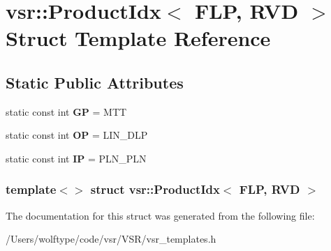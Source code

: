 \hypertarget{structvsr_1_1_product_idx_3_01_f_l_p_00_01_r_v_d_01_4}{\section{vsr\-:\-:Product\-Idx$<$ F\-L\-P, R\-V\-D $>$ Struct Template Reference}
\label{structvsr_1_1_product_idx_3_01_f_l_p_00_01_r_v_d_01_4}
}
\subsection*{Static Public Attributes}
\begin{DoxyCompactItemize}
\item 
\hypertarget{structvsr_1_1_product_idx_3_01_f_l_p_00_01_r_v_d_01_4_ab9134befd68ef1338df273fe0cc74aaa}{static const int {\bfseries G\-P} = M\-T\-T}\label{structvsr_1_1_product_idx_3_01_f_l_p_00_01_r_v_d_01_4_ab9134befd68ef1338df273fe0cc74aaa}

\item 
\hypertarget{structvsr_1_1_product_idx_3_01_f_l_p_00_01_r_v_d_01_4_a94d5fd1d0d019e4e2503cbc39e6147fb}{static const int {\bfseries O\-P} = L\-I\-N\-\_\-\-D\-L\-P}\label{structvsr_1_1_product_idx_3_01_f_l_p_00_01_r_v_d_01_4_a94d5fd1d0d019e4e2503cbc39e6147fb}

\item 
\hypertarget{structvsr_1_1_product_idx_3_01_f_l_p_00_01_r_v_d_01_4_a6eb95e5e90b0700784baa3c49ff0ae70}{static const int {\bfseries I\-P} = P\-L\-N\-\_\-\-P\-L\-N}\label{structvsr_1_1_product_idx_3_01_f_l_p_00_01_r_v_d_01_4_a6eb95e5e90b0700784baa3c49ff0ae70}

\end{DoxyCompactItemize}
\subsubsection*{template$<$$>$ struct vsr\-::\-Product\-Idx$<$ F\-L\-P, R\-V\-D $>$}



The documentation for this struct was generated from the following file\-:\begin{DoxyCompactItemize}
\item 
/\-Users/wolftype/code/vsr/\-V\-S\-R/vsr\-\_\-templates.\-h\end{DoxyCompactItemize}
